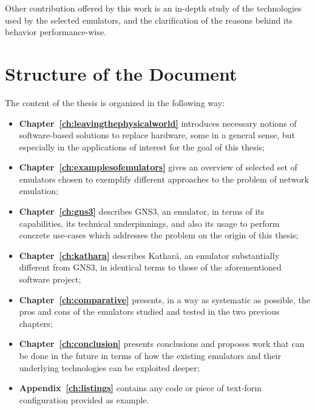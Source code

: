 Other contribution offered by this work is an in-depth study of the technologies used by the selected emulators, and the clarification of the reasons behind its behavior performance-wise.

\section{Structure of the Document}
\label{sec:structure}

The content of the thesis is organized in the following way:
\begin{itemize}
  \item \textbf{Chapter~\ref{ch:leavingthephysicalworld}} introduces necessary notions of software-based solutions to replace hardware, some in a general sense, but especially in the applications of interest for the goal of this thesis;
  \item \textbf{Chapter~\ref{ch:examplesofemulators}} gives an overview of selected set of emulators chosen to exemplify different approaches to the problem of network emulation;
  \item \textbf{Chapter~\ref{ch:gns3}} describes GNS3, an emulator, in terms of its capabilities, its technical underpinnings, and also its usage to perform concrete use-cases which addresses the problem on the origin of this thesis;
  \item \textbf{Chapter~\ref{ch:kathara}} describes Kathará, an emulator substantially different from GNS3, in identical terms to those of the aforementioned software project;
  \item \textbf{Chapter~\ref{ch:comparative}} presents, in a way as systematic as possible, the pros and cons of the emulators studied and tested in the two previous chapters;
  \item \textbf{Chapter~\ref{ch:conclusion}} presents conclusions and proposes work that can be done in the future in terms of how the existing emulators and their underlying technologies can be exploited deeper;
  \item \textbf{Appendix~\ref{ch:listings}} contains any code or piece of text-form configuration provided as example.
\end{itemize}

